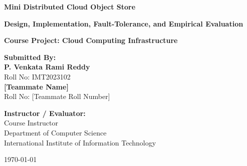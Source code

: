 \documentclass[11pt,a4paper]{article}
\begin{document}
\begin{titlepage}
    \centering
    \vspace*{1.5cm}
    
    {\Huge \bfseries Mini Distributed Cloud Object Store\par}
    \vspace{0.4cm}
    {\LARGE \bfseries Design, Implementation, Fault-Tolerance, and Empirical Evaluation\par}
    
    \vspace{1.5cm}
    {\Large \bfseries Course Project: Cloud Computing Infrastructure\par}
    \vspace{2.0cm}
    
    \begin{minipage}{0.48\textwidth}
        \begin{flushleft} \large
            \textbf{Submitted By:}\\
            \textbf{P. Venkata Rami Reddy}\\
            Roll No: IMT2023102\\[0.5cm]
            \textbf{[Teammate Name]}\\
            Roll No: [Teammate Roll Number]
        \end{flushleft}
    \end{minipage}
    \begin{minipage}{0.48\textwidth}
        \begin{flushright} \large
            \textbf{Instructor / Evaluator:}\\
            Course Instructor\\
            Department of Computer Science\\
            International Institute of Information Technology
        \end{flushright}
    \end{minipage}
    
    \vfill
    
    {\large \today\par}
\end{titlepage}

\tableofcontents
\newpage
\end{document}
